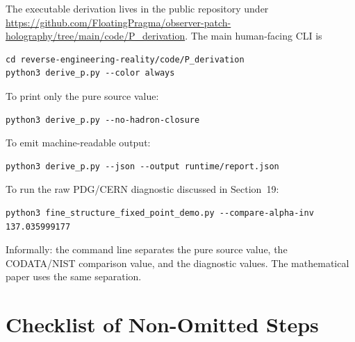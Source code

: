 \documentclass[11pt]{article}
\theoremstyle{remark}
\begin{document}
The executable derivation lives in the public repository under
\url{https://github.com/FloatingPragma/observer-patch-holography/tree/main/code/P_derivation}.
The main human-facing CLI is
\begin{verbatim}
cd reverse-engineering-reality/code/P_derivation
python3 derive_p.py --color always
\end{verbatim}
To print only the pure source value:
\begin{verbatim}
python3 derive_p.py --no-hadron-closure
\end{verbatim}
To emit machine-readable output:
\begin{verbatim}
python3 derive_p.py --json --output runtime/report.json
\end{verbatim}
To run the raw PDG/CERN diagnostic discussed in Section~19:
\begin{verbatim}
python3 fine_structure_fixed_point_demo.py --compare-alpha-inv 137.035999177
\end{verbatim}

Informally: the command line separates the pure source value, the CODATA/NIST comparison value, and the diagnostic values. The mathematical paper uses the same separation.

\section{Checklist of Non-Omitted Steps}
\end{document}
